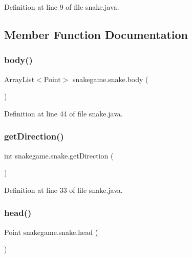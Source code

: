 Definition at line 9 of file snake.\+java.



\subsection{Member Function Documentation}
\mbox{\label{classsnakegame_1_1snake_a63cca0235c21cd483d69bb52e17d48cf}} 
\subsubsection{\texorpdfstring{body()}{body()}}
{\footnotesize\ttfamily Array\+List$<$Point$>$ snakegame.\+snake.\+body (\begin{DoxyParamCaption}{ }\end{DoxyParamCaption})}



Definition at line 44 of file snake.\+java.

\mbox{\label{classsnakegame_1_1snake_a488d8293668de46cd8daf048d26a2b55}} 
\subsubsection{\texorpdfstring{get\+Direction()}{getDirection()}}
{\footnotesize\ttfamily int snakegame.\+snake.\+get\+Direction (\begin{DoxyParamCaption}{ }\end{DoxyParamCaption})}



Definition at line 33 of file snake.\+java.

\mbox{\label{classsnakegame_1_1snake_a1f9f29ffc498ba715fbb5419f35bc7fa}} 
\subsubsection{\texorpdfstring{head()}{head()}}
{\footnotesize\ttfamily Point snakegame.\+snake.\+head (\begin{DoxyParamCaption}{ }\end{DoxyParamCaption})}



